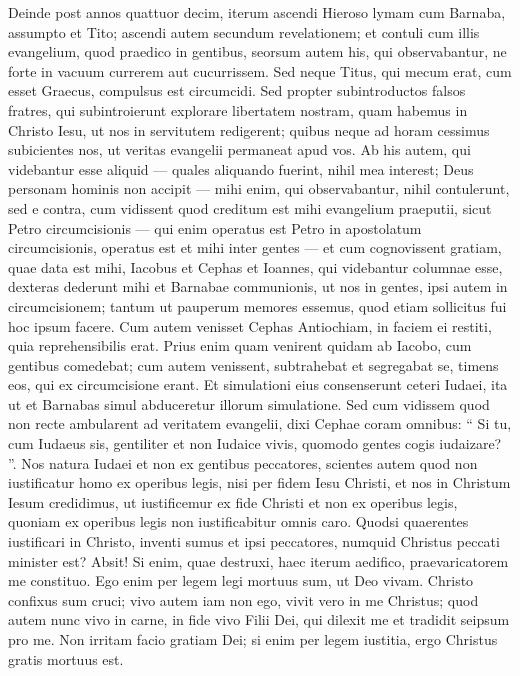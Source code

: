 \begin{biblechapter}
\begin{biblechapter}
\verse Deinde post annos quattuor decim, iterum ascendi Hieroso lymam cum Barnaba, assumpto et Tito; 
 \verse ascendi autem secundum revelationem; et contuli cum illis evangelium, quod praedico in gentibus, seorsum autem his, qui observabantur, ne forte in vacuum currerem aut cucurrissem. 
\verse Sed neque Titus, qui mecum erat, cum esset Graecus, compulsus est circumcidi. 
\verse Sed propter subintroductos falsos fratres, qui subintroierunt explorare libertatem nostram, quam habemus in Christo Iesu, ut nos in servitutem redigerent; 
\verse quibus neque ad horam cessimus subicientes nos, ut veritas evangelii permaneat apud vos.
 \verse Ab his autem, qui videbantur esse aliquid — quales aliquando fuerint, nihil mea interest; Deus personam hominis non accipit — mihi enim, qui observabantur, nihil contulerunt, 
\verse sed e contra, cum vidissent quod creditum est mihi evangelium praeputii, sicut Petro circumcisionis 
\verse — qui enim operatus est Petro in apostolatum circumcisionis, operatus est et mihi inter gentes — 
\verse et cum cognovissent gratiam, quae data est mihi, Iacobus et Cephas et Ioannes, qui videbantur columnae esse, dexteras dederunt mihi et Barnabae communionis, ut nos in gentes, ipsi autem in circumcisionem; 
\verse tantum ut pauperum memores essemus, quod etiam sollicitus fui hoc ipsum facere.
 \verse Cum autem venisset Cephas Antiochiam, in faciem ei restiti, quia reprehensibilis erat. 
\verse Prius enim quam venirent quidam ab Iacobo, cum gentibus comedebat; cum autem venissent, subtrahebat et segregabat se, timens eos, qui ex circumcisione erant. 
\verse Et simulationi eius consenserunt ceteri Iudaei, ita ut et Barnabas simul abduceretur illorum simulatione. 
\verse Sed cum vidissem quod non recte ambularent ad veritatem evangelii, dixi Cephae coram omnibus: “ Si tu, cum Iudaeus sis, gentiliter et non Iudaice vivis, quomodo gentes cogis iudaizare? ”. 
\verse Nos natura Iudaei et non ex gentibus peccatores, 
\verse scientes autem quod non iustificatur homo ex operibus legis, nisi per fidem Iesu Christi, et nos in Christum Iesum credidimus, ut iustificemur ex fide Christi et non ex operibus legis, quoniam ex operibus legis non iustificabitur omnis caro.
 \verse Quodsi quaerentes iustificari in Christo, inventi sumus et ipsi peccatores, numquid Christus peccati minister est? Absit! 
\verse Si enim, quae destruxi, haec iterum aedifico, praevaricatorem me constituo. 
\verse Ego enim per legem legi mortuus sum, ut Deo vivam. Christo confixus sum cruci; 
\verse vivo autem iam non ego, vivit vero in me Christus; quod autem nunc vivo in carne, in fide vivo Filii Dei, qui dilexit me et tradidit seipsum pro me. 
\verse Non irritam facio gratiam Dei; si enim per legem iustitia, ergo Christus gratis mortuus est.
 

\end{biblechapter}
\end{biblechapter}
